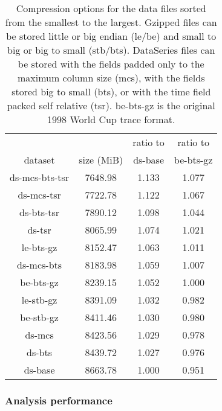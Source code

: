 \documentclass{acm_proc_article-sp}
\begin{document}
\begin{table}
\centering
\begin{tabular}{|c|c|c|c|}\hline

               &            & ratio to & ratio to \\
    dataset    & size (MiB) & ds-base & be-bts-gz \\
\hline							   
ds-mcs-bts-tsr & 7648.98  & 1.133         & 1.077         \\
ds-mcs-tsr     & 7722.78  & 1.122         & 1.067         \\
ds-bts-tsr     & 7890.12  & 1.098         & 1.044         \\
ds-tsr         & 8065.99  & 1.074         & 1.021         \\
le-bts-gz      & 8152.47  & 1.063         & 1.011         \\
ds-mcs-bts     & 8183.98  & 1.059         & 1.007         \\
be-bts-gz      & 8239.15  & 1.052         & 1.000         \\
le-stb-gz      & 8391.09  & 1.032         & 0.982         \\
be-stb-gz      & 8411.46  & 1.030         & 0.980         \\
ds-mcs         & 8423.56  & 1.029         & 0.978         \\
ds-bts         & 8439.72  & 1.027         & 0.976         \\
ds-base        & 8663.78  & 1.000         & 0.951         \\
\hline
\end{tabular}


\caption{Compression options for the data files sorted from the smallest 
to the largest.  Gzipped files can be stored little or big endian
(le/be) and small to big or big to small (stb/bts).  DataSeries files
can be stored with the fields padded only to the maximum column size
(mcs), with the fields stored big to small (bts), or with the time
field packed self relative (tsr). be-bts-gz is the original 1998 World
Cup trace format.}

\label{table:wc1998:compression}
\end{table}

\subsubsection{Analysis performance}
\end{document}
